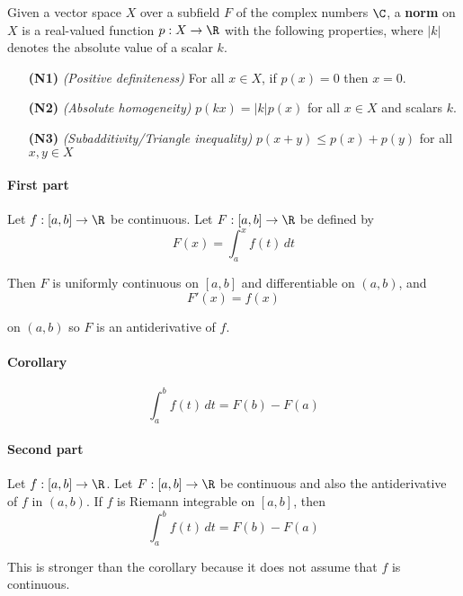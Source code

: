 \label{e0fff96}

Given a vector space $X$ over a subfield $F$ of the complex numbers $\C$, a
\textbf{norm} on $X$ is a real-valued function $p:X\to\R$ with the following
properties, where $|k|$ denotes the absolute value of a scalar $k$.
\begin{enumerate}
  \item [\textbf{(N1)}] \textit{(Positive definiteness)} For all $x\in
        X$, if $p(x)=0$ then $x=0$.
  \item [\textbf{(N2)}] \textit{(Absolute homogeneity)}
        $p(kx)=|k|p(x)$ for all $x\in X$ and scalars $k$.
  \item [\textbf{(N3)}] \textit{(Subadditivity/Triangle inequality)}
        $p(x+y)\leq p(x)+p(y)$ for all $x,y\in X$
\end{enumerate}


\label{b869dc0}

\paragraph{First part} Let $f:[a,b]\to\R$ be continuous. Let $F:[a,b]\to\R$ be defined by
$$F(x)=\int_a^xf(t)\,dt$$

Then $F$ is uniformly continuous on $[a,b]$ and differentiable on $(a,b)$, and
$$F'(x)=f(x)$$

on $(a,b)$ so $F$ is an antiderivative of $f$.

\paragraph{Corollary}
$$\int_a^bf(t)\,dt=F(b)-F(a)$$

\paragraph{Second part} Let $f:[a,b]\to\R$. Let $F:[a,b]\to\R$ be continuous and also the
antiderivative of $f$ in $(a,b)$. If $f$ is Riemann integrable on $[a,b]$, then
$$\int_a^bf(t)\,dt=F(b)-F(a)$$

This is stronger than the corollary because it does not assume that $f$ is
continuous.

